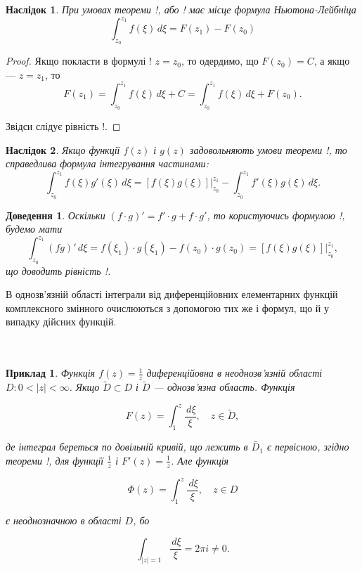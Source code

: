 \documentclass[12pt,fleqn]{article}
\newtheorem{exm}{Приклад}[section]
\theoremstyle{theorem}
\theoremstyle{proof}
\newtheorem*{dov}{Доведення}
\newtheorem{corollary}{Наслідок}[section]
\numberwithin{figure}{section}
\numberwithin{equation}{section}
\begin{document}
\begin{corollary}
При умовах теореми !, або ! має місце формула Ньютона-Лейбніца
\begin{equation}\label{xy}
\int_{z_0}^{z_1}f(\xi)\,d\xi = F(z_1) - F(z_0)
\end{equation}
\end{corollary}
\begin{proof}

Якщо покласти в формулі ! $z=z_0$, то одердимо, що $F(z_0)=C$, а якщо --- $z=z_1$, то
\[F(z_1)=\int_{z_0}^{z_1}f(\xi)\,d\xi + C = \int_{z_0}^{z_1}f(\xi)\,d\xi + F(z_0). \]

Звідси слідує рівність !.
\end{proof}

\begin{corollary}
Якщо функції $f(z)$ і $g(z)$ задовольняють умови теореми !, то справедлива формула інтегрування частинами:
\begin{equation}\label{xy}
\int_{z_0}^{z_1} f(\xi)g'(\xi)\,d\xi = [f(\xi)g(\xi)] \bigg|_{z_0}^{z_1}-\int_{z_0}^{z_1}f'(\xi)g(\xi)\,d\xi.
\end{equation}
\end{corollary}
\begin{dov}
Оскільки $(f\cdot g)'=f'\cdot g + f \cdot g'$, то користуючись формулою !, будемо мати
\[ \int_{z_0}^{z_1}(fg)'\,d\xi=f(\xi_1)\cdot g(\xi_1)-f(z_0)\cdot g(z_0) = [f(\xi)g(\xi)]\bigg|_{z_0}^{z_1}, \]
що доводить рівність !.
\end{dov}

В однозв'язній області інтеграли від диференційовних елементарних функцій комплексного змінного очислюються з допомогою тих же і формул, що й у випадку дійсних функцій.
\\ \\ \\
\begin{exm}
Функція $f(z)=\frac{1}{z}$ диференційовна в неоднозв'язній області $D:0<|z|<\infty$. Якщо $ \widetilde{D}\subset D$ і $\widetilde{D}$ --- однозв'язна область. Функція

\[ F(z) = \int_{1}^{z} \frac{\,d\xi}{\xi}, \quad z \in \widetilde{D}, \]

де інтеграл береться по довільній кривій, що лежить в $\widetilde{D_1}$ є первісною, згідно теореми !, для функції $\frac{1}{z}$ і $F'(z)=\frac{1}{z}$. Але функція

\[ \Phi (z)= \int_{1}^{z} \frac{\,d\xi}{\xi}, \quad z \in D \]

є неоднозначною в області $D$, бо

\[ \int_{|z|=1} \frac{\,d\xi}{\xi}=2\pi i \neq 0. \]
\end{exm}
\end{document}
